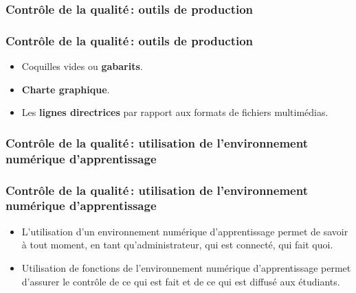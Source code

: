 					\subsubsection{Contrôle de la qualité\,: outils de production} 
							\begin{frame}
							\frametitle{Contrôle de la qualité\,: outils de production}
                        			
							\begin{itemize}
							
							\item Coquilles vides ou \textbf{gabarits}.
							\item \textbf{Charte graphique}.
							\item Les \textbf{lignes directrices} par rapport aux formats de fichiers multimédias.
												
							\end{itemize}						
					\end{frame}	
					\subsubsection{Contrôle de la qualité\,: utilisation de l'environnement numérique d'apprentissage} 
							\begin{frame}
							\frametitle{Contrôle de la qualité\,: utilisation de l'environnement numérique d'apprentissage}
                        			
							\begin{itemize}
							\item L’utilisation d'un environnement numérique d'apprentissage permet de savoir à tout moment, en tant qu’administrateur, qui est connecté, qui fait quoi.
							\item Utilisation de fonctions de l'environnement numérique d'apprentissage permet d’assurer le contrôle de ce qui est fait et de ce qui est diffusé aux étudiants.
							\end{itemize}						
					\end{frame}	
